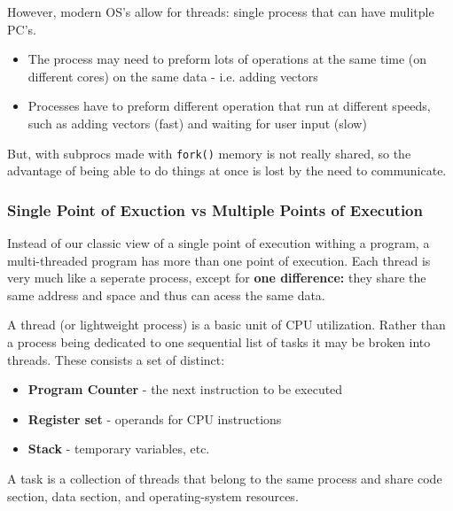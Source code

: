 \documentclass[a4paper, 10pt]{article}
\begin{document}
However, modern OS's allow for threads: single process that can have mulitple PC's.
\begin{conceptbox}
    \begin{itemize}
        \item The process may need to preform lots of operations at the same time (on different cores) on the same data - i.e. adding vectors
        \item Processes have to preform different operation that run at different speeds, such as adding vectors (fast) and waiting for user input (slow)
    \end{itemize}
\end{conceptbox}
But, with subprocs made with \texttt{fork()} memory is not really shared, so the advantage of being able to do things at once is lost by the need to communicate.
\subsubsection{Single Point of Exuction vs Multiple Points of Execution}
Instead of our classic view of a single point of execution withing a program, a multi-threaded program has more than one point of execution. Each thread is very much like a seperate process, except for \textbf{one difference:} they share the same address and space and thus can acess the same data.
\begin{definitionbox}[Thread]
    A thread (or lightweight process) is a basic unit of CPU utilization. Rather than a process being dedicated to one sequential list of tasks it may be broken into threads. These consists a set of distinct:
    \begin{itemize}
        \item \textbf{Program Counter} - the next instruction to be executed
        \item \textbf{Register set} - operands for CPU instructions
        \item \textbf{Stack} - temporary variables, etc.
    \end{itemize}
\end{definitionbox}
\begin{definitionbox}[Task]
    A task is a collection of threads that belong to the same process and share code section, data section, and operating-system resources.
\end{definitionbox}
\end{document}
